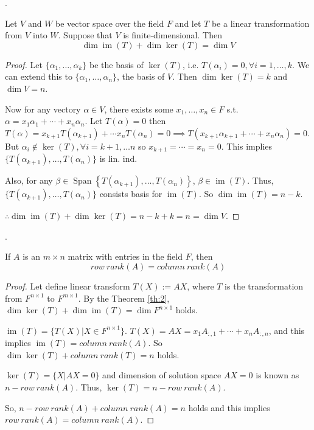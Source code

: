 \documentclass[8pt]{beamer}
\newcommand{\Span}[1]{\operatorname{Span}\!\left\{#1\right\}}
\newcommand{\im}{\operatorname{im}}
\begin{document}
\begin{frame}{.}
    \begin{theorem}\label{th:2}
        Let $V$ and $W$ be vector space over the field $F$ and let $T$ be a linear transformation from $V$ into $W$. 
        Suppose that $V$ is finite-dimensional. 
        Then
        \[
            \dim \im(T) + \dim \ker(T) = \dim V 
        \]
    \end{theorem}

    \begin{proof}
    Let $\{\alpha_1 , \dots, \alpha_k\}$ be the basis of $\ker (T)$, i.e. $T(\alpha_i) = 0, \forall i=1, \dots, k$. We can extend this to $\{\alpha_1, \dots, \alpha_n\}$, the basis of $V$. Then $\dim \ker (T) =k$ and $\dim V =n$.

    \smallskip
    Now for any vectory $\alpha \in V$, there exists some $x_1, \dots, x_n \in F$ s.t. $\alpha = x_1 \alpha_1 + \cdots +  x_n \alpha_n$.
    Let $T(\alpha) = 0 $ then $T(\alpha) = x_{k+1} T(\alpha_{k+1}) + \cdots x_{n} T(\alpha_n) = 0 \implies T(x_{k+1} \alpha_{k+1} + \cdots + x_n \alpha_n) = 0$. But $\alpha_i \notin \ker (T), \forall i=k+1, \dots n$ so $x_{k+1} = \cdots = x_n = 0$. This implies $\{T(\alpha_{k+1}), \dots, T(\alpha_{n})\}$ is lin. ind.

    \smallskip
    Also, for any $\beta \in \Span{ T(\alpha_{k+1}), \dots, T(\alpha_n)}$, $\beta \in \im(T)$. Thus, $\{T(\alpha_{k+1}), \dots, T(\alpha_n)\}$ consists basis for $\im(T)$. So $\dim \im(T) = n -k$.

    $\therefore \dim \im(T) + \dim \ker (T) = n-k + k = n = \dim V$.
    \end{proof}
    
\end{frame}

\begin{frame}{.}
    \begin{theorem}
        If $A$ is an $m \times n$ matrix with entries in the field $F$, then
        \[
            row\ rank(A) = column\ rank(A)
        \]
    \end{theorem}
    \begin{proof}
        Let define linear transform $T(X):= AX$, where $T$ is the transformation from $F^{n \times 1}$ to $F^{m \times 1}$.
        By the Theorem \ref{th:2}, $\dim \ker(T) + \dim \im(T) = \dim F^{n \times 1}$ holds.

        \smallskip
        $\im(T) = \{T(X)| X \in F^{n\times 1}\}$. $T(X) = AX = x_1 A_{:, 1} + \cdots + x_n A_{:, n}$, and this implies $\im(T) = column\ rank(A)$. So $\dim \ker(T) + column\ rank (T) = n $ holds.

        \smallskip
        $\ker(T) = \{X|AX = 0 \}$ and dimension of solution space $AX =0$ is known as $n- row\ rank(A)$. Thus, $\ker(T) = n - row\ rank(A)$.

        \smallskip
        So, $n - row\ rank(A) + column\ rank(A) =n$ holds and this implies $row\ rank(A) = column\ rank(A)$.

    \end{proof}
\end{frame}
\end{document}
